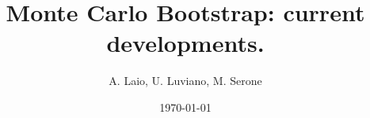 \documentclass[letterpaper]{article}
\date{\today}
\numberwithin{equation}{section}
\begin{document}
\title{
  Monte Carlo Bootstrap: current developments.
  }
\author{
  A. Laio, U. Luviano, M. Serone
}

\newcommand{\inty}{\int_{-\infty}^{\infty}} 
\newcommand{\Lag}{\mathcal{L}} 
\newcommand{\Id}{\mathbb{I}} 
\newcommand{\Tr}{\mathrm{Tr}} 
\newcommand{\tr}{\mathrm{tr}} 
\newcommand{\Det}{\mathrm{Det}} 
\newcommand{\gauge}{\mathcal{A}} 
\newcommand{\Lac}{\ensuremath{\mathbf{\hat{L}^2}}} 
\newcommand{\La}{\ensuremath{\mathbf{\hat{L}}}} 
\newcommand{\Ham}{\ensuremath{\hat{H}}} 
\renewcommand{\a}{\ensuremath{(e_1)}}
\renewcommand{\b}{\ensuremath{(e_2)}}
\renewcommand{\c}{\ensuremath{(e_3)}}
\newcommand\cd{\mathrel{\stackrel{\makebox[0pt]{\mbox{\normalfont\tiny
CD}}}{\longleftrightarrow}}}
\newcommand{\tmop}[1]{\ensuremath{\operatorname{#1}}}
\newcommand{\then}{\ensuremath{\Rightarrow}}
\newcommand{\res}{\ensuremath{\mathrm{Res}}}
\newcommand{\R}{\ensuremath{\mathbb{R}}}
\newcommand{\integral}[1]{\ensuremath{\int_{a}^{b} #1 dt}}
\def\UV{{\textsc{uv}}}
\def\IR{{\textsc{ir}}}
\def\gX{{g_\textsc{x}}}
\def\gY{{g_\textsc{y}}}
\def\dslash{\raisebox{1pt}{$\slash$} \hspace{-7pt} \partial}
\def\pslash{\raisebox{1pt}{$\slash$} \hspace{-7pt} p}
\def\qslash{\raisebox{1pt}{$\slash$} \hspace{-7pt} q}
\def\Aslash{\hspace{3pt}\raisebox{1pt}{$\slash$} \hspace{-9pt} A}
\def\Dslash{\hspace{3pt}\raisebox{1pt}{$\slash$} \hspace{-9pt} D}
\def\Dslashn{\hspace{3pt}\raisebox{1pt}{$\slash$} \hspace{-7pt} D}
\def\bea{\begin{eqnarray}} \def\eea{\end{eqnarray}}
\def\be{\begin{equation}} \def\ee{\end{equation}} \def\nn{\nonumber}
\def\a{& \hspace{-7pt}} \def\c{\hspace{-5pt}} \def\Z{{\bf Z}}
\def\zb{\overline{z}} \def\ov{\overline} \def\I{1\hspace{-4pt}1}
\def\ds{\displaystyle} \def\de{\partial} \def\deb{\ov{\partial}}
\def\dsl{\partial\hspace{-6pt}/} \def\psl{p\hspace{-5pt}/}
\def\taub{\bar \tau} \def\R{\mathcal R} \def\RR{   R}
\end{document}
